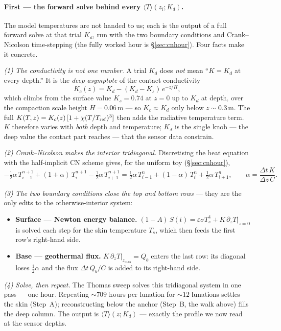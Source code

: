 \documentclass[11pt]{report}
\newcommand{\Tm}{\langle T\rangle}
\begin{document}
\paragraph{First --- the forward solve behind every $\Tm(z_i;K_d)$.} The model
temperatures are not handed to us; each is the output of a full forward solve at that
trial $K_d$, run with the two boundary conditions and Crank--Nicolson time-stepping (the
fully worked hour is \S\ref{sec:cnhour}). Four facts make it concrete.

\emph{(1) The conductivity is not one number.} A trial $K_d$ does \emph{not} mean
``$K=K_d$ at every depth.'' It is the \emph{deep asymptote} of the contact conductivity
\[
K_c(z)=K_d-(K_d-K_s)\,e^{-z/H},
\]
which climbs from the surface value $K_s=0.74$ at $z=0$ up to $K_d$ at depth, over the
compaction scale height $H=0.06$\,m --- so $K_c\approx K_d$ only below $z\sim0.3$\,m. The
full $K(T,z)=K_c(z)\,[1+\chi(T/T_{\rm ref})^3]$ then adds the radiative temperature term.
$K$ therefore varies with \emph{both} depth and temperature; $K_d$ is the single knob ---
the deep value the contact part reaches --- that the sensor data constrain.

\emph{(2) Crank--Nicolson makes the interior tridiagonal.} Discretising the heat equation
with the half-implicit CN scheme gives, for the uniform toy (\S\ref{sec:cnhour}),
\[
-\tfrac12\alpha\,T_{i-1}^{n+1}+(1+\alpha)\,T_i^{n+1}-\tfrac12\alpha\,T_{i+1}^{n+1}
=\tfrac12\alpha\,T_{i-1}^{n}+(1-\alpha)\,T_i^{n}+\tfrac12\alpha\,T_{i+1}^{n},
\qquad\alpha=\frac{\Delta t\,K}{\Delta z\,C}.
\]

\emph{(3) The two boundary conditions close the top and bottom rows} --- they are the only
edits to the otherwise-interior system:
\begin{itemize}[leftmargin=1.6em,itemsep=1pt,topsep=2pt]
\item \textbf{Surface --- Newton energy balance.} $(1-A)\,S(t)=\varepsilon\sigma T_s^4
  +K\,\partial_z T|_{z=0}$ is solved each step for the skin temperature $T_s$, which then
  feeds the first row's right-hand side.
\item \textbf{Base --- geothermal flux.} $K\,\partial_z T|_{z_{\max}}=Q_b$ enters the last
  row: its diagonal loses $\tfrac12\alpha$ and the flux $\Delta t\,Q_b/C$ is added to its
  right-hand side.
\end{itemize}

\emph{(4) Solve, then repeat.} The Thomas sweep solves this tridiagonal system in one pass
--- one hour. Repeating ${\sim}709$ hours per lunation for ${\sim}12$ lunations settles the
skin (Step~A); reconstructing below the anchor (Step~B, the walk above) fills the deep
column. The output is $\Tm(z;K_d)$ --- exactly the profile we now read at the sensor depths.
\end{document}

